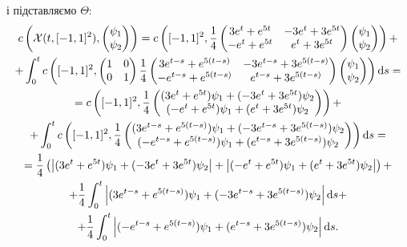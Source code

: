 \begin{solution}
	і підставляємо $\Theta$:
	\begin{multline*} 
		c\left(\mathcal{X}(t, [-1,1]^2), \begin{pmatrix} \psi_1 \\ \psi_2 \end{pmatrix}\right) = c\left([-1,1]^2, \frac{1}{4} \begin{pmatrix} 3 e^t + e^{5 t} & -3 e^t + 3 e^{5 t} \\ - e^t + e^{5 t} & e^t + 3 e^{5 t}	\end{pmatrix} \begin{pmatrix} \psi_1 \\ \psi_2 \end{pmatrix} \right) + \\
		+ \int_0^t c\left([-1,1]^2, \begin{pmatrix} 1 & 0 \\ 0 & 1 \end{pmatrix} \frac{1}{4} \begin{pmatrix} 3 e^{t - s} + e^{5 (t - s)} & -3 e^{t - s} + 3 e^{5 (t - s)} \\ - e^{t - s} + e^{5 (t - s)} & e^{t - s} + 3 e^{5 (t - s)} \end{pmatrix} \begin{pmatrix} \psi_1 \\ \psi_2 \end{pmatrix} \right) \mathop{}\!\mathrm{d} s = \\
		= c\left([-1,1]^2, \frac{1}{4} \begin{pmatrix} (3 e^t + e^{5 t}) \psi_1 + (-3 e^t + 3 e^{5 t}) \psi_2 \\ (- e^t + e^{5 t}) \psi_1 + (e^t + 3 e^{5 t}) \psi_2 \end{pmatrix}  \right) + \\
		+ \int_0^t c\left([-1,1]^2, \frac{1}{4} \begin{pmatrix} (3 e^{t - s} + e^{5 (t - s)}) \psi_1 + (-3 e^{t - s} + 3 e^{5 (t - s)}) \psi_2 \\ (- e^{t - s} + e^{5 (t - s)}) \psi_1 + (e^{t - s} + 3 e^{5 (t - s)}) \psi_2 \end{pmatrix} \right) \mathop{}\!\mathrm{d} s = \\
		= \frac{1}{4} \left( \left|(3 e^t + e^{5 t}) \psi_1 + (-3 e^t + 3 e^{5 t}) \psi_2\right| + \left|(- e^t + e^{5 t}) \psi_1 + (e^t + 3 e^{5 t}) \psi_2\right| \right) + \\
		+ \frac{1}{4} \int_0^t \left|(3 e^{t - s} + e^{5 (t - s)}) \psi_1 + (-3 e^{t - s} + 3 e^{5 (t - s)}) \psi_2\right| \mathop{}\!\mathrm{d} s + \\
		+ \frac{1}{4} \int_0^t \left|(- e^{t - s} + e^{5 (t - s)}) \psi_1 + (e^{t - s} + 3 e^{5 (t - s)}) \psi_2\right| \mathop{}\!\mathrm{d} s.
	\end{multline*}
\end{solution}

